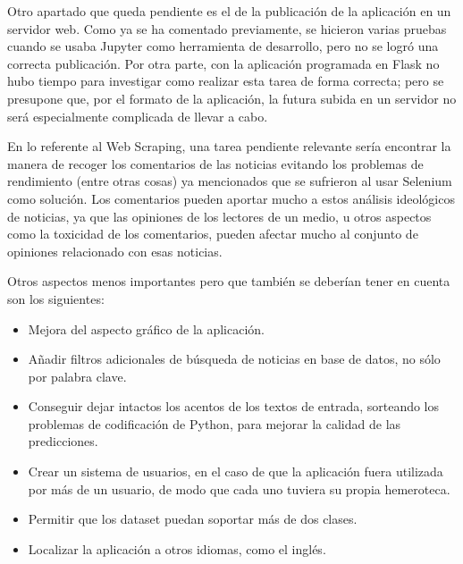 Otro apartado que queda pendiente es el de la publicación de la aplicación en un servidor web. Como ya se ha comentado previamente, se hicieron varias pruebas cuando se usaba Jupyter como herramienta de desarrollo, pero no se logró una correcta publicación. Por otra parte, con la aplicación programada en Flask no hubo tiempo para investigar como realizar esta tarea de forma correcta; pero se presupone que, por el formato de la aplicación, la futura subida en un servidor no será especialmente complicada de llevar a cabo.

En lo referente al Web Scraping, una tarea pendiente relevante sería encontrar la manera de recoger los comentarios de las noticias evitando los problemas de rendimiento (entre otras cosas) ya mencionados que se sufrieron al usar Selenium como solución. Los comentarios pueden aportar mucho a estos análisis ideológicos de noticias, ya que las opiniones de los lectores de un medio, u otros aspectos como la toxicidad de los comentarios, pueden afectar mucho al conjunto de opiniones relacionado con esas noticias.

Otros aspectos menos importantes pero que también se deberían tener en cuenta son los siguientes:

\begin{itemize}

\item Mejora del aspecto gráfico de la aplicación.

\item Añadir filtros adicionales de búsqueda de noticias en base de datos, no sólo por palabra clave.

\item Conseguir dejar intactos los acentos de los textos de entrada, sorteando los problemas de codificación de Python, para mejorar la calidad de las predicciones.

\item Crear un sistema de usuarios, en el caso de que la aplicación fuera utilizada por más de un usuario, de modo que cada uno tuviera su propia hemeroteca.

\item Permitir que los dataset puedan soportar más de dos clases.

\item Localizar la aplicación a otros idiomas, como el inglés.

\end{itemize}